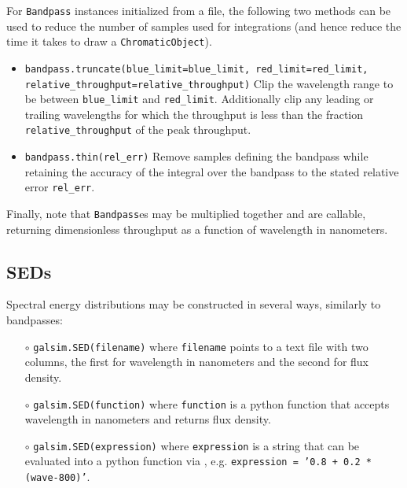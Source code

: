 \documentclass[preprint,11pt]{../../devel/modules/aastex}
\begin{document}
For \texttt{Bandpass} instances initialized from a file, the following two methods can be used to
reduce the number of samples used for integrations (and hence reduce the time it takes to draw
a \texttt{ChromaticObject}).
\begin{itemize}
\item {\tt bandpass.truncate(blue\_limit=blue\_limit, red\_limit=red\_limit, \newline
                             relative\_throughput=relative\_throughput)}
  Clip the wavelength range to be between \texttt{blue\_limit} and \texttt{red\_limit}.
  Additionally clip any leading or trailing wavelengths for which the throughput is less than
  the fraction \texttt{relative\_throughput} of the peak throughput.
\item {\tt bandpass.thin(rel\_err)}  Remove samples defining the bandpass while retaining the
accuracy of the integral over the bandpass to the stated relative error \texttt{rel\_err}.
\end{itemize}

Finally, note that \texttt{Bandpass}es may be multiplied together and are callable, returning
dimensionless throughput as a function of wavelength in nanometers.

\subsection{SEDs}
Spectral energy distributions may be constructed in several ways, similarly to bandpasses:
\begin{itemize}
\item[$\circ$] {\tt galsim.SED(filename)} \newline where \texttt{filename} points to a
  text file with two columns, the first for wavelength in nanometers and the second for flux
  density.
\item[$\circ$] {\tt galsim.SED(function)} \newline where \texttt{function} is a python
  function that accepts wavelength in nanometers and returns flux density.
\item[$\circ$] {\tt galsim.SED(expression)} \newline where \texttt{expression} is a string
  that can be evaluated into a python function via ,
  \newline e.g. {\tt expression = '0.8 + 0.2 * (wave-800)'}.
\end{itemize}
\end{document}
